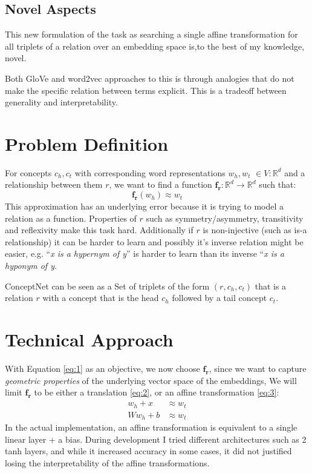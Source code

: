 \subsection{Novel Aspects}
This new formulation of the task as searching a single affine transformation
for all triplets of a relation over an embedding space is,to the best of my knowledge, novel.

Both GloVe and word2vec approaches to this is through analogies that do
not make the specific relation between terms explicit. This is a tradeoff between
generality and interpretability.


\section{Problem Definition}

For concepts $c_h , c_t$
with corresponding word representations $w_h , w_t$ $\in V : \mathbb{R}^d$ and a relationship
between them $r$,
we want to find a function $\bm{f_r} : \mathbb{R}^d \to \mathbb{R}^d$ such that:
\begin{equation}
    \bm{f_r}(w_h) \approx w_t \label{eq:1}
\end{equation}
This approximation has an underlying error because it is trying to model a relation as a function.
Properties of $r$ such as symmetry/asymmetry, transitivity and reflexivity make this task hard.
Additionally if $r$ is non-injective (such as is-a relationship) it can be harder to learn and
possibly it's inverse relation might be easier, e.g. ``\textit{x is a hypernym of y}'' is
harder to learn than its inverse ``\textit{x is a hyponym of y}.

ConceptNet can be seen as a Set of triplets of the form $(r,c_h,c_t)$ that is a relation $r$
with a concept that is the head $c_h$ followed by a tail concept $c_t$.

\section{Technical Approach}

With Equation \eqref{eq:1} as an objective, we now choose $\bm{f_r}$,
since we want to capture \textit{geometric properties} of the underlying vector space of the embeddings,
We will limit $\bm{f_r}$ to be either a translation \eqref{eq:2}, or an affine transformation  \eqref{eq:3}:
\begin{align}
    w_h + x &\approx w_t \label{eq:2} \\
    Ww_h + b &\approx w_t \label{eq:3}
\end{align}
In the actual implementation, an affine transformation is equivalent to a single linear layer +
a bias.
During development I tried different architectures such as 2 tanh layers, and while it increased
accuracy in some cases, it did not justified losing the interpretability of the affine transformations.

